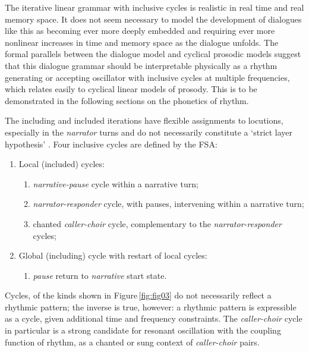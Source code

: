 \documentclass[output=paper,colorlinks,citecolor=brown
]{langscibook}
\begin{document}
The iterative linear grammar with inclusive cycles is realistic in real time and real memory space. It does not seem necessary to model the development of  dialogues like this as becoming ever more deeply embedded and requiring ever more nonlinear increases in time and memory space as the dialogue unfolds. The formal parallels between the dialogue model and cyclical prosodic models suggest that this dialogue grammar should be interpretable physically as a rhythm generating or accepting oscillator with inclusive cycles at multiple frequencies, which relates easily to cyclical linear models of prosody. This is to be demonstrated in the following sections on the phonetics of rhythm.

The including and included iterations have flexible assignments to locutions, especially in the \textit{narrator} turns and do not necessarily constitute a `strict layer hypothesis' \cite{selkirk1984}. Four inclusive cycles are defined by the FSA:
\vspace{-10pt}
\begin{enumerate} \itemsep -5pt
\item Local (included) cycles:
\vspace{-12pt}
	\begin{enumerate} \itemsep -5pt
	\item[] \textit{narrative-pause} cycle within a narrative turn;
	\item[] \textit{narrator-responder} cycle, with pauses, intervening within a narrative turn;
	\item[] chanted \textit{caller-choir} cycle, complementary to the \textit{narrator-responder} cycles;
	\end{enumerate}
\vspace{-5pt}
\item Global (including) cycle with restart of local cycles:
\vspace{-10pt}
	\begin{enumerate} \itemsep -5pt
	\item[] \textit{pause} return to \textit{narrative} start state.
	\end{enumerate}
\end{enumerate}
\vspace{-10pt}
Cycles, of the kinds shown in Figure\,\ref{fig:fig03} do not necessarily reflect a rhythmic pattern; the inverse is true, however: a rhythmic pattern is expressible as a cycle, given additional time and frequency constraints. The \textit{caller-choir} cycle in particular is a strong candidate for resonant oscillation with the coupling function of rhythm, as a chanted or sung context of \textit{caller-choir} pairs.
\end{document}
